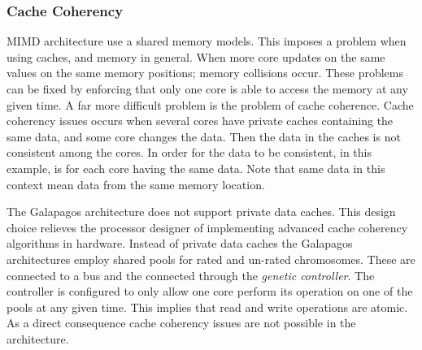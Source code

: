 \subsubsection{Cache Coherency}
MIMD architecture use a shared memory models.
This imposes a problem when using caches, and memory in general.
When more core updates on the same values on the same memory positions; memory collisions occur.
These problems can be fixed by enforcing that only one core is able to access the memory at any given time.
A far more difficult problem is the problem of cache coherence.
Cache coherency issues occurs when several cores have private caches containing the same data, and some core changes the data.
Then the data in the caches is not consistent among the cores.
In order for the data to be consistent, in this example, is for each core having the same data.
Note that same data in this context mean data from the same memory location.


The Galapagos architecture does not support private data caches.
This design choice relieves the processor designer of implementing advanced cache coherency algorithms in hardware.
Instead of private data caches the Galapagos architectures employ shared pools for rated and un-rated chromosomes.
These are connected to a bus and the connected through the \emph{genetic controller}.
The controller is configured to only allow one core perform its operation on one of the pools at any given time.
This implies that read and write operations are atomic.
As a direct consequence cache coherency issues are not possible in the architecture.


